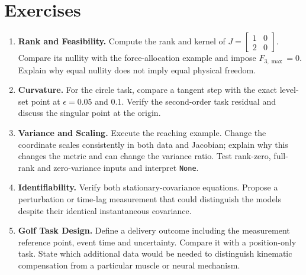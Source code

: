 \section*{Exercises}
\begin{enumerate}
 \item \textbf{Rank and Feasibility.} Compute the rank and kernel of
 $J=\left[\begin{smallmatrix}1&0\\2&0\end{smallmatrix}\right]$.
 Compare its nullity with the force-allocation example and impose $F_{3,\max}=0$.
 Explain why equal nullity does not imply equal physical freedom.
 \item \textbf{Curvature.} For the circle task, compare a tangent step with
 the exact level-set point at $\epsilon=0.05$ and $0.1$.
 Verify the second-order task residual and discuss the singular point at the origin.
 \item \textbf{Variance and Scaling.} Execute the reaching example.
 Change the coordinate scales consistently in both data and Jacobian; explain
 why this changes the metric and can change the variance ratio.
 Test rank-zero, full-rank and zero-variance inputs and interpret \texttt{None}.
 \item \textbf{Identifiability.} Verify both stationary-covariance equations.
 Propose a perturbation or time-lag measurement that could distinguish the
 models despite their identical instantaneous covariance.
 \item \textbf{Golf Task Design.} Define a delivery outcome including the
 measurement reference point, event time and uncertainty. Compare it with a
 position-only task. State which additional data would be needed to distinguish
 kinematic compensation from a particular muscle or neural mechanism.
\end{enumerate}
